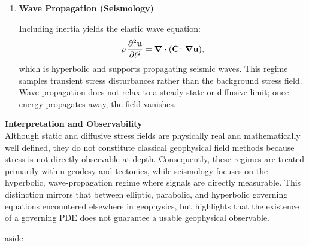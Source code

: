 {\begin{enumerate}
        which typically ranges from decades to thousands of years depending on rheology. In the continental crust, effective relaxation times are commonly $10^1--10^3$ years, while in the upper mantle they may be shorter where viscosities are lower. This diffusive regime underlies postseismic deformation, where stress perturbations introduced by earthquakes relax through viscoelastic flow and poroelastic pressure diffusion. Observational access to this regime is indirect, relying on geodetic measurements (e.g., GPS, InSAR) rather than traditional geophysical field observations.

        \item \textbf{Wave Propagation (Seismology)}

        Including inertia yields the elastic wave equation:
        \[
            \rho \, \pdv[2]{\vb{u}}{t} = \div{(\vb{C} \colon \grad \vb{u})},
        \]
        which is hyperbolic and supports propagating seismic waves. This regime samples transient stress disturbances rather than the background stress field. Wave propagation does not relax to a steady-state or diffusive limit; once energy propagates away, the field vanishes.
    \end{enumerate}

    \noindent\textbf{Interpretation and Observability}\\
    Although static and diffusive stress fields are physically real and mathematically well defined, they do not constitute classical geophysical field methods because stress is not directly observable at depth. Consequently, these regimes are treated primarily within geodesy and tectonics, while seismology focuses on the hyperbolic, wave-propagation regime where signals are directly measurable.  This distinction mirrors that between elliptic, parabolic, and hyperbolic governing equations encountered elsewhere in geophysics, but highlights that the existence of a governing PDE does not guarantee a usable geophysical observable.
}{aside}


\nocite{Fowler1990}
\nocite{Lowrie1997}
\nocite{Schey1997}



